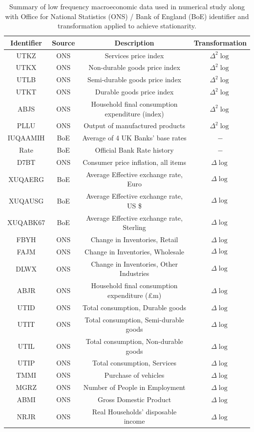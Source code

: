 \documentclass[11pt]{report}\usepackage[utf8]{inputenc}
\begin{document}
\begin{table}[h]
    \centering
    \begin{tabular}{c|c|c|c}
    \cmidrule(r){1-4}
    Identifier & Source & Description & Transformation\\
    \hline
    UTKZ & ONS & Services price index & $\Delta^2 \log$ \\
    UTKX & ONS & Non-durable goods price index & $\Delta^2 \log$ \\
    UTLB & ONS & Semi-durable goods price index & $\Delta^2 \log$ \\
    UTKT & ONS & Durable goods price index & $\Delta^2 \log$ \\
    ABJS & ONS & Household final consumption expenditure (index) & $\Delta^2 \log$ \\
    PLLU & ONS & Output of manufactured products & $\Delta^2 \log$\\
    IUQAAMIH & BoE & Average of 4 UK Banks' base rates & $-$\\
    Rate & BoE & Official Bank Rate history & $-$\\
    D7BT & ONS & Consumer price inflation, all items & $\Delta \log$ \\
    XUQAERG & BoE & Average Effective exchange rate, Euro & $$\Delta \log$$\\
    XUQAUSG & BoE & Average Effective exchange rate, US \$ & $$\Delta \log$$\\
    XUQABK67 & BoE & Average Effective exchange rate, Sterling & $$\Delta \log$$\\
    FBYH & ONS & Change in Inventories, Retail & $\Delta \log$ \\
    FAJM & ONS & Change in Inventories, Wholesale & $$\Delta \log$$ \\
    DLWX & ONS & Change in Inventories, Other Industries & $$\Delta \log$$ \\
    ABJR & ONS & Household final consumption expenditure (£m) & $\Delta \log$ \\
    UTID & ONS & Total consumption, Durable goods & $\Delta \log$ \\
    UTIT & ONS & Total consumption, Semi-durable goods & $\Delta \log$ \\
    UTIL & ONS & Total consumption, Non-durable goods & $\Delta \log$ \\
    UTIP & ONS & Total consumption, Services & $\Delta \log$\\
    TMMI & ONS & Purchase of vehicles & $\Delta \log$ \\
    MGRZ & ONS & Number of People in Employment & $\Delta \log$\\
    ABMI & ONS & Gross Domestic Product & $\Delta \log$\\
    NRJR & ONS & Real Households' disposable income & $\Delta \log$
    \end{tabular}
    \caption{Summary of low frequency macroeconomic data used in numerical study along with Office for National Statistics (ONS) / Bank of England (BoE) identifier and transformation applied to achieve stationarity. }
    \label{data description}
\end{table}
\end{document}

